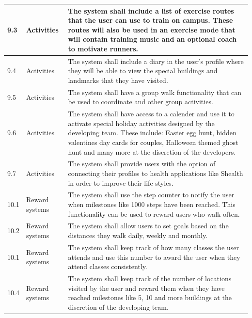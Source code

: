 \documentclass[12pt]{article}
\begin{document}
\begin{longtable}{|p{}| p{} | p{} |}
\hline

9.3& Activities & The system shall include a list of exercise routes that the user can use to train on campus. These routes will also be used in an exercise mode that will contain training music and an optional coach to motivate runners.\\

\hline

9.4& Activities & The system shall include a diary in the user's profile where they will be able to view the special buildings and landmarks that they have visited.\\

\hline

9.5& Activities & The system shall have a group walk functionality that can be used to coordinate  and other group activities.\\ 

\hline

9.6& Activities & The system shall have access to a calender and use it to activate special holiday activities designed by the developing team. These include: Easter egg hunt, hidden valentines day cards for couples, Halloween themed ghost hunt and many more at the discretion of the developers.\\

\hline

9.7& Activities & The system shall provide users with the option of connecting their profiles to health applications like Shealth in order to improve their life styles.\\

\hline

10.1& Reward systems & The system shall use the step counter to notify the user when milestones like 1000 steps have been reached. This functionality can be used to reward users who walk often.\\

\hline

10.2& Reward systems & The system shall allow users to set goals based on the distances they walk daily, weekly and monthly. \\

\hline

10.1& Reward systems & The system shall keep track of how many classes the user attends and use this number to award the user when they attend classes consistently.\\

\hline

10.4& Reward systems& The system  shall keep track of the number of locations visited by the user and reward them when they have reached milestones like 5, 10 and more buildings at the discretion of the developing team.\\


\end{longtable}
\end{document}
